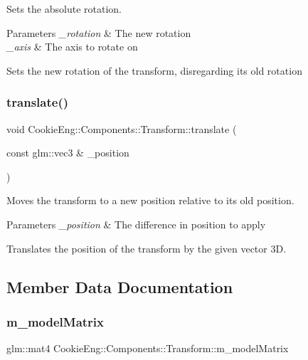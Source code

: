 Sets the absolute rotation. 


\begin{DoxyParams}{Parameters}
{\em \+\_\+rotation} & The new rotation \\
\hline
{\em \+\_\+axis} & The axis to rotate on\\
\hline
\end{DoxyParams}
Sets the new rotation of the transform, disregarding its old rotation \mbox{\label{class_cookie_eng_1_1_components_1_1_transform_afe2e00e8126fd92eab8c2e1a5725b2c5}} 
\subsubsection{\texorpdfstring{translate()}{translate()}}
{\footnotesize\ttfamily void Cookie\+Eng\+::\+Components\+::\+Transform\+::translate (\begin{DoxyParamCaption}\item[{const glm\+::vec3 \&}]{\+\_\+position }\end{DoxyParamCaption})}



Moves the transform to a new position relative to its old position. 


\begin{DoxyParams}{Parameters}
{\em \+\_\+position} & The difference in position to apply\\
\hline
\end{DoxyParams}
Translates the position of the transform by the given vector 3D. 

\subsection{Member Data Documentation}
\mbox{\label{class_cookie_eng_1_1_components_1_1_transform_ab4c66323537c12117739471665c6ddf9}} 
\subsubsection{\texorpdfstring{m\+\_\+model\+Matrix}{m\_modelMatrix}}
{\footnotesize\ttfamily glm\+::mat4 Cookie\+Eng\+::\+Components\+::\+Transform\+::m\+\_\+model\+Matrix\hspace{0.3cm}{\ttfamily [protected]}}

